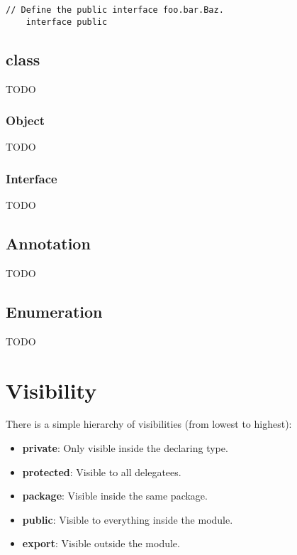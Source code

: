 \documentclass[11pt,a4paper]{report}
\begin{document}
\begin{lstlisting}[language=CayThe, title=foo/bar/Baz.ct]
    // Define the public interface foo.bar.Baz.
    interface public
\end{lstlisting}

\subsection{class}

TODO

\subsubsection{Object}

TODO

\subsubsection{Interface}

TODO

\subsection{Annotation}

TODO

\subsection{Enumeration}

TODO

\section{Visibility}

There is a simple hierarchy of visibilities (from lowest to highest):

\begin{itemize}
    \item \textbf{private}: Only visible inside the declaring type.
    \item \textbf{protected}: Visible to all delegatees.
    \item \textbf{package}: Visible inside the same package.
    \item \textbf{public}: Visible to everything inside the module.
    \item \textbf{export}: Visible outside the module.
\end{itemize}
\end{document}
